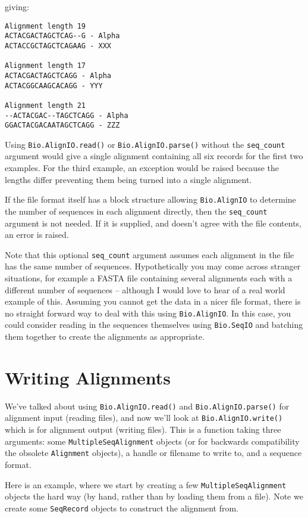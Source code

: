 \noindent giving:

\begin{verbatim}
Alignment length 19
ACTACGACTAGCTCAG--G - Alpha
ACTACCGCTAGCTCAGAAG - XXX

Alignment length 17
ACTACGACTAGCTCAGG - Alpha
ACTACGGCAAGCACAGG - YYY

Alignment length 21
--ACTACGAC--TAGCTCAGG - Alpha
GGACTACGACAATAGCTCAGG - ZZZ
\end{verbatim}

Using \verb|Bio.AlignIO.read()| or \verb|Bio.AlignIO.parse()| without the \verb|seq_count| argument would give a single alignment containing all six records for the first two examples.  For the third example, an exception would be raised because the lengths differ preventing them being turned into a single alignment.

If the file format itself has a block structure allowing \verb|Bio.AlignIO| to determine the number of sequences in each alignment directly, then the \verb|seq_count| argument is not needed.  If it is supplied, and doesn't agree with the file contents, an error is raised.

Note that this optional \verb|seq_count| argument assumes each alignment in the file has the same number of sequences.  Hypothetically you may come across stranger situations, for example a FASTA file containing several alignments each with a different number of sequences -- although I would love to hear of a real world example of this.  Assuming you cannot get the data in a nicer file format, there is no straight forward way to deal with this using \verb|Bio.AlignIO|.  In this case, you could consider reading in the sequences themselves using \verb|Bio.SeqIO| and batching them together to create the alignments as appropriate.

\section{Writing Alignments}

We've talked about using \verb|Bio.AlignIO.read()| and \verb|Bio.AlignIO.parse()| for alignment input (reading files), and now we'll look at \verb|Bio.AlignIO.write()| which is for alignment output (writing files).  This is a function taking three arguments: some \verb|MultipleSeqAlignment| objects (or for backwards compatibility the obsolete \verb|Alignment| objects), a handle or filename to write to, and a sequence format.

Here is an example, where we start by creating a few \verb|MultipleSeqAlignment| objects the hard way (by hand, rather than by loading them from a file).
Note we create some \verb|SeqRecord| objects to construct the alignment from.

